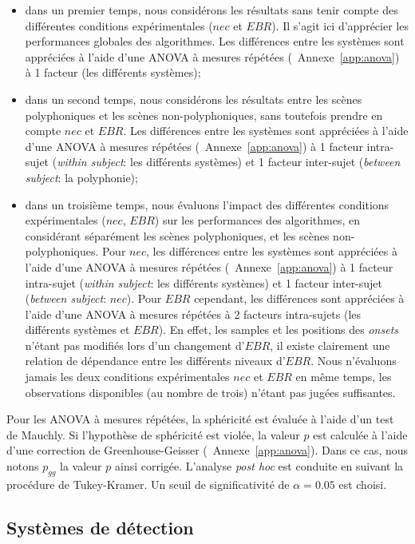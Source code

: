 \begin{itemize}
\item dans un premier temps, nous considérons les résultats sans tenir compte des différentes conditions expérimentales ($nec$ et $EBR$). Il s'agit ici d'apprécier les performances globales des algorithmes. Les différences entre les systèmes sont appréciées à l'aide d'une ANOVA à mesures répétées (\cf~Annexe~\ref{app:anova}) à 1 facteur (les différents systèmes);
\item dans un second temps, nous considérons les résultats entre les scènes polyphoniques et les scènes non-polyphoniques, sans toutefois prendre en compte $nec$ et $EBR$. Les différences entre les systèmes sont appréciées à l'aide d'une ANOVA à mesures répétées (\cf~Annexe~\ref{app:anova}) à 1 facteur intra-sujet (\emph{within subject}: les différents systèmes) et 1 facteur inter-sujet (\emph{between subject}: la polyphonie); 
\item dans un troisième temps, nous évaluons l'impact des différentes conditions expérimentales ($nec$, $EBR$) sur les performances des algorithmes, en considérant séparément les scènes polyphoniques, et les scènes non-polyphoniques. Pour $nec$, les différences entre les systèmes sont appréciées à l'aide d'une ANOVA à mesures répétées (\cf~Annexe~\ref{app:anova}) à 1 facteur intra-sujet (\emph{within subject}: les différents systèmes) et 1 facteur inter-sujet (\emph{between subject}: $nec$). Pour $EBR$ cependant, les différences sont appréciées à l'aide d'une ANOVA à mesures répétées à 2 facteurs intra-sujets (les différents systèmes et $EBR$). En effet, les samples et les positions des \emph{onsets} n'étant pas modifiés lors d'un changement d'$EBR$, il existe clairement une relation de dépendance entre les différents niveaux d'$EBR$. Nous n'évaluons jamais les deux conditions expérimentales $nec$ et $EBR$ en même temps, les observations disponibles (au nombre de trois) n'étant pas jugées suffisantes.
\end{itemize}

Pour les ANOVA à mesures répétées, la sphéricité est évaluée à l'aide d'un test de Mauchly. Si l'hypothèse de sphéricité est violée, la valeur $p$ est calculée à l'aide d'une correction de Greenhouse-Geisser (\cf~Annexe~\ref{app:anova}). Dans ce cas, nous notons $p_{gg}$ la valeur $p$ ainsi corrigée. L'analyse \emph{post hoc} est conduite en suivant la procédure de Tukey-Kramer. Un seuil de significativité de $\alpha=0.05$ est choisi.

\subsection{Systèmes de détection}

